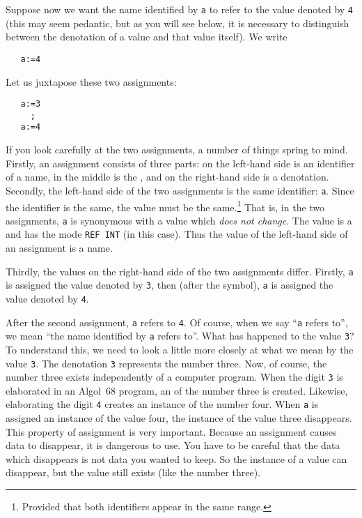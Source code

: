 Suppose now we want the name identified by \verb|a| to refer to the
value denoted by \verb|4| (this may seem pedantic, but as you will
see below, it is necessary to distinguish between the denotation of a
value and that value itself).  We write
\begin{verbatim}
   a:=4
\end{verbatim}
\noindent
Let us juxtapose these two assignments:
\begin{verbatim}
   a:=3
     ;
   a:=4
\end{verbatim}
\noindent
If you look carefully at the two assignments, a number of things
spring to mind. Firstly, an assignment consists of three parts: on
the left-hand side is an identifier of a name, in the middle is the
, and on the right-hand side is a denotation.
Secondly, the left-hand side of the two assignments is the same
identifier: \verb|a|.  Since the identifier is the same, the value
must be the same.\footnote{Provided that both identifiers appear in
the same range.}  That is, in the two assignments, \verb|a| is
synonymous with a value which \textit{does not change}. The value is a
 and has the mode \verb|REF INT| (in this case).  Thus the
value of the left-hand side of an assignment is a name.

Thirdly, the values on the right-hand side of the two assignments
differ. Firstly, \verb|a| is assigned the value denoted by \verb|3|,
then (after the  symbol), \verb|a| is assigned
the value denoted by \verb|4|.

After the second assignment, \verb|a| refers to \verb|4|.  Of course,
when we say ``\verb|a| refers to'', we mean ``the name identified by
\verb|a| refers to''. What has happened to the value \verb|3|? To
understand this, we need to look a little more closely at what we
mean by the value \verb|3|. The denotation \verb|3| represents the
number three. Now, of course, the number three exists independently
of a computer program. When the digit \verb|3| is elaborated in an
Algol~68 program, an  of the number three is created.
Likewise, elaborating the digit \verb|4| creates an instance of the
number four.  When \verb|a| is assigned an instance of the value
four, the instance of the value three disappears. This property of
assignment is very important. Because an assignment causes data to
disappear, it is dangerous to use. You have to be careful that the
data which disappears is not data you wanted to keep. So the instance
of a value can disappear, but the value still exists (like the number
three).

